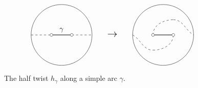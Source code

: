 \documentclass{amsart}
\numberwithin{equation}{section}
\theoremstyle{plain}
\theoremstyle{definition}
\begin{document}
\begin{figure}[h]
    \centering
    \begin{displaymath}
        \begin{tikzpicture}
            \draw (0, 1.5) circle[radius=1.5];
            \draw[thick] (-0.5, 1.5)--(0.5, 1.5);
            \draw[dashed] (-1.5, 1.5)--(-0.5, 1.5);
            \draw[dashed] (0.5, 1.5)--(1.5, 1.5);

            \foreach \u in {-0.5, 0.5}
                {
                    \filldraw[white] (\u, 1.5) circle (2pt);
                    \draw[black] (\u, 1.5) circle (2pt);
                }
            \draw(0, 1.5) node[above]{$\gamma$};

            \draw(2.5, 1.5) node{\Large$\rightarrow$};

            \draw (0+5, 1.5) circle[radius=1.5];
            \draw[thick] (-0.5+5, 1.5)--(0.5+5, 1.5);

            \draw[dashed](-1.5+5, 1.5) to[out=-30,in=180](-0.5+5, 0.75);
            \draw[dashed](-0.5+5, 0.75) to[out=0,in=-90](0.5+5, 1.5);

            \draw[dashed](-0.5+5, 1.5) to[out=90,in=180](0.5+5, 2.25);
            \draw[dashed](0.5+5, 2.25) to[out=0,in=150](1.5+5, 1.5);


            \foreach \u in {-0.5, 0.5}
                {
                    \filldraw[white] (\u+5, 1.5) circle (2pt);
                    \draw[black] (\u+5, 1.5) circle (2pt);
                }
        \end{tikzpicture}
    \end{displaymath}
    \caption{The half twist $h_\gamma$ along a simple arc $\gamma$.}
    \label{fig:half-twist}
\end{figure}
\end{document}
